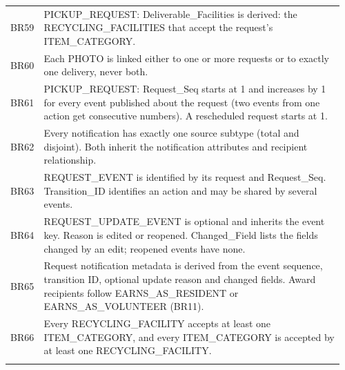 \begin{longtable}{@{}p{0.07\linewidth}>{\raggedright\arraybackslash}p{0.89\linewidth}@{}}
\addlinespace[2pt]
BR59 & PICKUP\_REQUEST: Deliverable\_Facilities is derived: the RECYCLING\_FACILITIES that accept the request's ITEM\_CATEGORY. \\
\addlinespace[2pt]
BR60 & Each PHOTO is linked either to one or more requests or to exactly one delivery, never both. \\
\addlinespace[2pt]
BR61 & PICKUP\_REQUEST: Request\_Seq starts at 1 and increases by 1 for every event published about the request (two events from one action get consecutive numbers). A rescheduled request starts at 1. \\
\addlinespace[2pt]
BR62 & Every notification has exactly one source subtype (total and disjoint). Both inherit the notification attributes and recipient relationship. \\
\addlinespace[2pt]
BR63 & REQUEST\_EVENT is identified by its request and Request\_Seq. Transition\_ID identifies an action and may be shared by several events. \\
\addlinespace[2pt]
BR64 & REQUEST\_UPDATE\_EVENT is optional and inherits the event key. Reason is edited or reopened. Changed\_Field lists the fields changed by an edit; reopened events have none. \\
\addlinespace[2pt]
BR65 & Request notification metadata is derived from the event sequence, transition ID, optional update reason and changed fields. Award recipients follow EARNS\_AS\_RESIDENT or EARNS\_AS\_VOLUNTEER (BR11). \\
\addlinespace[2pt]
BR66 & Every RECYCLING\_FACILITY accepts at least one ITEM\_CATEGORY, and every ITEM\_CATEGORY is accepted by at least one RECYCLING\_FACILITY. \\
\addlinespace[2pt]
\end{longtable}
